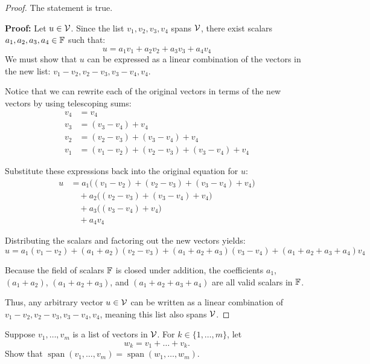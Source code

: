 \begin{proof}
	The statement is true. 
	
	\textbf{Proof:}
	Let $u \in \mathcal{V}$. Since the list $v_1, v_2, v_3, v_4$ spans $\mathcal{V}$, there exist scalars $a_1, a_2, a_3, a_4 \in \mathbb{F}$ such that:
	\[
	u = a_1 v_1 + a_2 v_2 + a_3 v_3 + a_4 v_4
	\]
	We must show that $u$ can be expressed as a linear combination of the vectors in the new list: $v_1 - v_2, v_2 - v_3, v_3 - v_4, v_4$. 
	
	Notice that we can rewrite each of the original vectors in terms of the new vectors by using telescoping sums:
	\begin{align*}
		v_4 &= v_4 \\
		v_3 &= (v_3 - v_4) + v_4 \\
		v_2 &= (v_2 - v_3) + (v_3 - v_4) + v_4 \\
		v_1 &= (v_1 - v_2) + (v_2 - v_3) + (v_3 - v_4) + v_4
	\end{align*}
	
	Substitute these expressions back into the original equation for $u$:
	\begin{align*}
		u &= a_1\big((v_1 - v_2) + (v_2 - v_3) + (v_3 - v_4) + v_4\big) \\
		&\quad + a_2\big((v_2 - v_3) + (v_3 - v_4) + v_4\big) \\
		&\quad + a_3\big((v_3 - v_4) + v_4\big) \\
		&\quad + a_4v_4
	\end{align*}
	
	Distributing the scalars and factoring out the new vectors yields:
	\[
	u = a_1(v_1 - v_2) + (a_1 + a_2)(v_2 - v_3) + (a_1 + a_2 + a_3)(v_3 - v_4) + (a_1 + a_2 + a_3 + a_4)v_4
	\]
	
	Because the field of scalars $\mathbb{F}$ is closed under addition, the coefficients $a_1$, $(a_1 + a_2)$, $(a_1 + a_2 + a_3)$, and $(a_1 + a_2 + a_3 + a_4)$ are all valid scalars in $\mathbb{F}$. 
	
	Thus, any arbitrary vector $u \in \mathcal{V}$ can be written as a linear combination of $v_1 - v_2, v_2 - v_3, v_3 - v_4, v_4$, meaning this list also spans $\mathcal{V}$.
\end{proof}
\begin{question}
	Suppose $v_1, \dots, v_m$ is a list of vectors in $\mathcal{V}$. For $k \in \{1, \dots, m\}$, let
	\[
	w_k = v_1 + \dots + v_k.
	\]
	Show that $\operatorname{span}(v_1, \dots, v_m) = \operatorname{span}(w_1, \dots, w_m)$.
\end{question}
